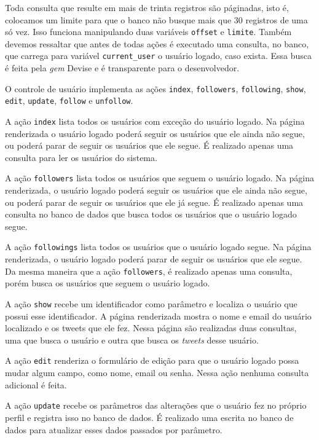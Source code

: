 Toda consulta que resulte em mais de trinta registros são páginadas, isto é, colocamos um limite para que o banco não busque mais que 30 registros de uma só vez. Isso funciona manipulando duas variáveis \verb|offset| e \verb|limite|. Também devemos ressaltar que
antes de todas ações é executado uma consulta, no banco, que carrega para variável \verb|current_user| o usuário logado, caso exista. Essa busca é feita pela \textit{gem} Devise e é transparente para o desenvolvedor.

O controle de usuário implementa as ações \verb|index|, \verb|followers|, \verb|following|, \verb|show|, \verb|edit|, \verb|update|, \verb|follow| e \verb|unfollow|.

A ação \verb|index| lista todos os usuários com exceção do usuário logado. Na página renderizada o usuário logado poderá seguir os usuários que ele ainda não segue, ou poderá parar de seguir os usuários que ele segue. É realizado apenas uma consulta para ler os usuários do sistema.

A ação \verb|followers| lista todos os usuários que seguem o usuário logado. Na página renderizada, o usuário logado poderá seguir os usuários que ele ainda não segue, ou poderá parar de seguir os usuários que ele já segue. É realizado apenas uma consulta no banco de dados que busca todos os usuários que o usuário logado segue.

A ação \verb|followings| lista todos os usuários que o usuário logado segue. Na página renderizada, o usuário logado poderá parar de seguir os usuários que ele segue. Da mesma maneira que a ação \verb|followers|, é realizado apenas uma consulta, porém busca os usuários que seguem o usuário logado.

A ação \verb|show| recebe um identificador como parâmetro e localiza o usuário que possui esse identificador. A página renderizada mostra o nome e email do usuário localizado e os tweets que ele fez. Nessa página são realizadas duas consultas, uma que busca o usuário e outra que busca os \textit{tweets} desse usuário.

A ação \verb|edit| renderiza o formulário de edição para que o usuário logado possa mudar algum campo, como nome, email ou senha. Nessa ação nenhuma consulta adicional é feita.

A ação \verb|update| recebe os parâmetros das alterações que o usuário fez no próprio perfil e registra isso no banco de dados. É realizado uma escrita no banco de dados para atualizar esses dados passados por parâmetro.


